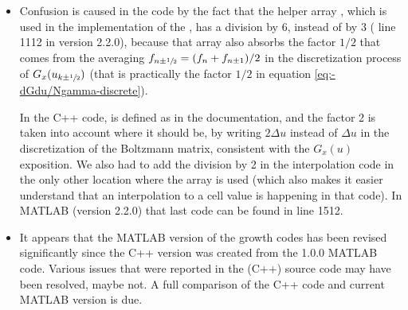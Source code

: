 \documentclass{book}
\newcommand{\frachalf}{\ensuremath{\sfrac{1}{2}}}
\begin{document}
\begin{itemize}
\begin{itemize}
			The manual does not explain how to handle the first and last cells,
			but for those the derivatives can of course be approximated with the
			asymmetric approximations $(f_1-f_0)/\Delta u$ and
			$(f_{{\cal N}-1}-f_{{\cal N}-2})/\Delta u$.

			In the original code, $C_k$ is expressed in terms of  and ,
                        which makes the expression a bit more difficult to grasp. To understand the
			expressions in the original code, note that
			\begin{lstlisting}[language=C++]
alphaRedEffNew*U0inf[k-1] == alphaRedEffNew*(-EoN /(2.*grid().du())*D0[k]) (= -C_k/(2*du))
alphaRedEffNew*U0sup[k+1] == alphaRedEffNew*(+EoN /(2.*grid().du())*D0[k]) (= +C_k/(2*du))
			\end{lstlisting}
\begin{framed}
			At the boundary points, the discretization seems wrong. The problem
			is the same as that in the evaluation of $\mu_eE$, see \ref{sec:muD-eval}.
\end{framed}

\begin{framed}
			It is important that the same coefficients (here called $C_k$) are used in
			the discretization of the growth operator as in the evaluation of the
			mobility. This means that also the mobility must use the expression involving
			the derivative of the EEDF, instead of the more convenient expression that
			is based on a partial integration of the integrand.
\end{framed}
	\end{itemize}
\item Confusion is caused in the code by the fact that the
	helper array , which is used in the implementation
	of the , has a division by 6,
	instead of by 3 ( line 1112 in version
	2.2.0), because that array also absorbs the factor $1/2$ that comes from the
	averaging $f_{n\pm\frachalf}=(f_n+f_{n\pm 1})/2$ in the discretization process of
	$G_x(u_{k\pm\frachalf})$ (that is practically the factor $1/2$ in equation
	\ref{eq:-dGdu/Ngamma-discrete}).

	In the C++ code,  is defined as in the documentation,
	and the factor 2 is taken into account where it should be, by writing $2\Delta u$
	instead of $\Delta u$ in the discretization of the Boltzmann matrix, consistent
	with the $G_x(u)$ exposition. We also had to add the division by 2 in the
	interpolation code
	 in
	the only other location where the array is used (which also makes it easier
	understand that an interpolation to a cell value is happening in that code).
	In MATLAB (version 2.2.0) that last code can be found in
	 line 1512.
\item It appears that the MATLAB version of the growth codes has been revised
	significantly since the C++ version was created from the 1.0.0 MATLAB code.
	Various issues that were reported in the (C++) source code may have
	been resolved, maybe not. A full comparison of the C++ code and current MATLAB
	version is due.
\end{itemize}
\end{document}
